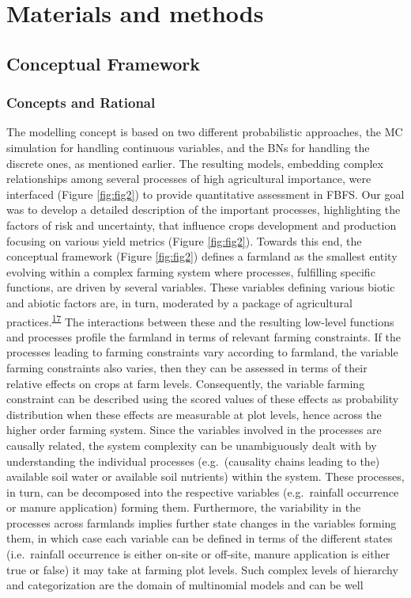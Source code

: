 \documentclass[12pt,oneside]{article}
\begin{document}
\hypertarget{III}{%
\section{Materials and methods}\label{III}}

\hypertarget{III1}{%
\subsection{Conceptual Framework}\label{III1}}

\hypertarget{III11}{%
\subsubsection{Concepts and Rational}\label{III11}}

The modelling concept is based on two different probabilistic approaches, the MC simulation for handling continuous variables, and the BNs for handling the discrete ones, as mentioned earlier. The resulting models, embedding complex relationships among several processes of high agricultural importance, were interfaced (Figure \ref{fig:fig2}) to provide quantitative assessment in FBFS. Our goal was to develop a detailed description of the important processes, highlighting the factors of risk and uncertainty, that influence crops development and production focusing on various yield metrics (Figure \ref{fig:fig2}). Towards this end, the conceptual framework (Figure \ref{fig:fig2}) defines a farmland as the smallest entity evolving within a complex farming system where processes, fulfilling specific functions, are driven by several variables. These variables defining various biotic and abiotic factors are, in turn, moderated by a package of agricultural practices.\textsuperscript{\protect\hyperlink{ref-Jax_and_Setala_2005}{17}} The interactions between these and the resulting low-level functions and processes profile the farmland in terms of relevant farming constraints. If the processes leading to farming constraints vary according to farmland, the variable farming constraints also varies, then they can be assessed in terms of their relative effects on crops at farm levels. Consequently, the variable farming constraint can be described using the scored values of these effects as probability distribution when these effects are measurable at plot levels, hence across the higher order farming system. Since the variables involved in the processes are causally related, the system complexity can be unambiguously dealt with by understanding the individual processes (e.g.~(causality chains leading to the) available soil water or available soil nutrients) within the system. These processes, in turn, can be decomposed into the respective variables (e.g.~rainfall occurrence or manure application) forming them. Furthermore, the variability in the processes across farmlands implies further state changes in the variables forming them, in which case each variable can be defined in terms of the different states (i.e.~rainfall occurrence is either on-site or off-site, manure application is either true or false) it may take at farming plot levels. Such complex levels of hierarchy and categorization are the domain of multinomial models and can be well 
\end{document}
